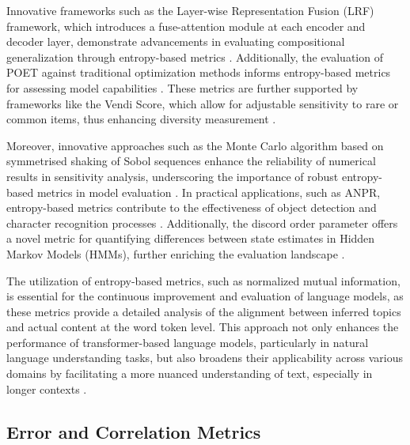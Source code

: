 Innovative frameworks such as the Layer-wise Representation Fusion (LRF) framework, which introduces a fuse-attention module at each encoder and decoder layer, demonstrate advancements in evaluating compositional generalization through entropy-based metrics \cite{zheng2023layerwiserepresentationfusioncompositional}. Additionally, the evaluation of POET against traditional optimization methods informs entropy-based metrics for assessing model capabilities \cite{wang2019pairedopenendedtrailblazerpoet}. These metrics are further supported by frameworks like the Vendi Score, which allow for adjustable sensitivity to rare or common items, thus enhancing diversity measurement \cite{pasarkar2024cousinsvendiscorefamily}.

Moreover, innovative approaches such as the Monte Carlo algorithm based on symmetrised shaking of Sobol sequences enhance the reliability of numerical results in sensitivity analysis, underscoring the importance of robust entropy-based metrics in model evaluation \cite{dimov2017multidimensionalsensitivityanalysislargescale}. In practical applications, such as ANPR, entropy-based metrics contribute to the effectiveness of object detection and character recognition processes \cite{adak2022automaticnumberplaterecognition}. Additionally, the discord order parameter offers a novel metric for quantifying differences between state estimates in Hidden Markov Models (HMMs), further enriching the evaluation landscape \cite{lathouwers2017memorypaysdiscordhidden}.

The utilization of entropy-based metrics, such as normalized mutual information, is essential for the continuous improvement and evaluation of language models, as these metrics provide a detailed analysis of the alignment between inferred topics and actual content at the word token level. This approach not only enhances the performance of transformer-based language models, particularly in natural language understanding tasks, but also broadens their applicability across various domains by facilitating a more nuanced understanding of text, especially in longer contexts \cite{ginzburg2021selfsuperviseddocumentsimilarityranking,shi2019newevaluationframeworktopic}.


\subsection{Error and Correlation Metrics} \label{subsec:Error and Correlation Metrics}



